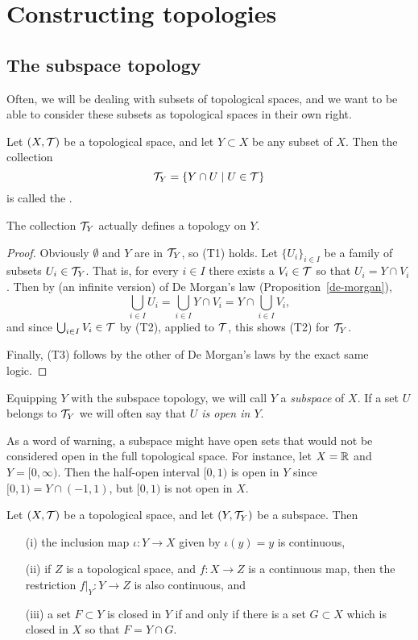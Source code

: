 \section{Constructing topologies}
\subsection{The subspace topology}
Often, we will be dealing with subsets of topological spaces, and we want to be able to consider these subsets as topological spaces in their own right.
\begin{defn}
  Let $(X,\mathcal{T})$ be a topological space, and let $Y \subset X$ be any subset of $X$. Then the collection
  \[
    \mathcal{T}_Y = \{ Y \cap U \mid U \in \mathcal{T} \}
  \]
  is called the .
\end{defn}
\begin{lem}
  The collection $\mathcal{T}_Y$ actually defines a topology on $Y$.
\end{lem}
\begin{proof}
  Obviously $\emptyset$ and $Y$ are in $\mathcal{T}_Y$, so (T1) holds. Let $\{U_i\}_{i\in I}$ be a family of subsets $U_i \in \mathcal{T}_Y$. That is, for every $i \in I$ there exists a $V_i \in \mathcal{T}$ so that $U_i = Y \cap V_i$. Then by (an infinite version) of De Morgan's law (Proposition~\ref{de-morgan}),
  \[
    \bigcup_{i \in I} U_i = \bigcup_{i \in I} Y \cap V_i = Y \cap \bigcup_{i \in I} V_i,
  \]
  and since $\bigcup_{i \in I} V_i \in \mathcal{T}$ by (T2), applied to $\mathcal{T}$, this shows (T2) for $\mathcal{T}_Y$.
  
  Finally, (T3) follows by the other of De Morgan's laws by the exact same logic.
\end{proof}
Equipping $Y$ with the subspace topology, we will call $Y$ a \emph{subspace} of $X$. If a set $U$ belongs to $\mathcal{T}_Y$ we will often say that \emph{$U$ is open in $Y$}.
\begin{example}
  \label{weird-opens-subspace-example}
  As a word of warning, a subspace might have open sets that would not be considered open in the full topological space. For instance, let $X = \mathbb{R}$ and $Y = [0,\infty)$. Then the half-open interval $[0,1)$ is open in $Y$ since $[0,1) = Y \cap (-1,1)$, but $[0,1)$ is not open in $X$.
\end{example}
\begin{prop}
  \label{props-subspace-top}
  Let $(X,\mathcal{T})$ be a topological space, and let $(Y,\mathcal{T}_Y)$ be a subspace. Then
  \begin{enumerate}
    \item[(i)] the inclusion map $\iota : Y \to X$ given by $\iota(y) = y$ is continuous,
    \item[(ii)] if $Z$ is a topological space, and $f : X \to Z$ is a continuous map, then the restriction $f|_Y : Y \to Z$ is also continuous, and
    \item[(iii)] a set $F \subset Y$ is closed in $Y$ if and only if there is a set $G \subset X$ which is closed in $X$ so that $F = Y \cap G$.
  \end{enumerate}
\end{prop}
